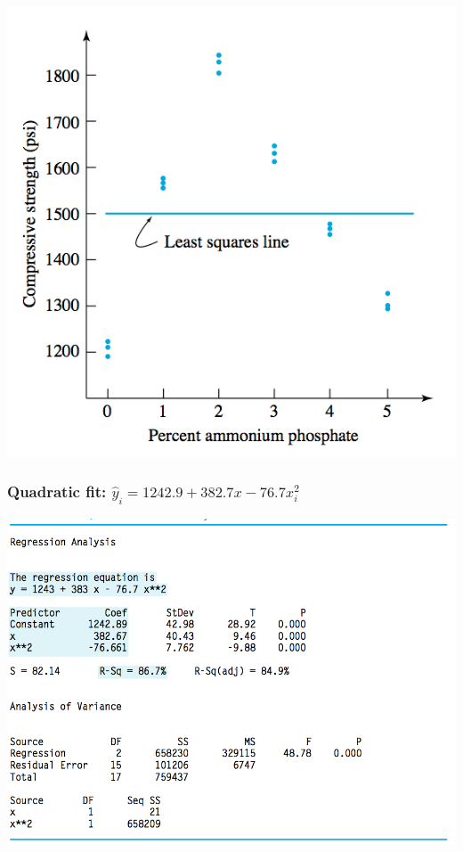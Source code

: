 \documentclass[handout]{beamer}\usepackage{graphicx, color}
\providecommand{\wh}[1]{\widehat{#1}}
\numberwithin{equation}{section}
\begin{document}
\begin{frame}
\begin{minipage}[b]{.48\linewidth}
 \includegraphics{../../fig/flyashslrfit2.png}
\end{minipage}
\end{frame}

\begin{frame}
\frametitle{Quadratic fit: $\wh{y}_i = 1242.9 + 382.7x - 76.7x_i^2$}
 \includegraphics{../../fig/flyashquadfitoutput.png}
\end{frame}
\end{document}
